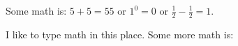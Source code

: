 \documentclass{article}
\begin{document}





\par Some math is: $5 + 5 = 55$ or $1^0 = 0$ or $\frac{1}{2} - \frac{1}{2} = 1$.

\par I like to type math in this place. Some more math is:




\end{document}
